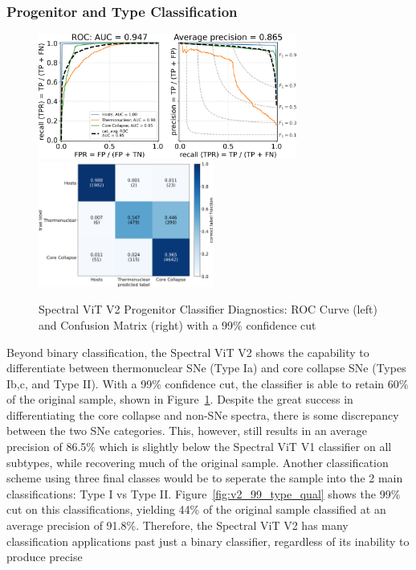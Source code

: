 \subsubsection{Progenitor and Type Classification}
\begin{figure}[htb!]
    \centering
    \includegraphics[height=4.1cm]{figures/v2_applications/vit_model_V2roc99_proj_e26.png}
    \quad
    \includegraphics[height=4.1cm]{figures/v2_applications/vit_model_V2cm99_proj_e26.png}
    \caption[Spectral ViT V2 Progenitor Classifier Diagnostics]{Spectral ViT V2 
    Progenitor Classifier Diagnostics: ROC Curve (left) and Confusion Matrix (right) with a 99\% confidence
    cut\label{fig:v2_99_proj_qual}}
\end{figure}
Beyond binary classification, the Spectral ViT V2 shows the capability to differentiate between 
thermonuclear SNe (Type Ia) and core collapse SNe (Types Ib,c, and Type II). With a 99\% confidence 
cut, the classifier is able to retain 60\% of the original sample, shown in Figure~\ref{fig:v2_99_proj_qual}. 
Despite the great success in differentiating the core collapse and non-SNe spectra, there is some discrepancy 
between the two SNe categories. This, however, still results in an average precision of 86.5\% which is slightly
below the Spectral ViT V1 classifier on all subtypes, while recovering much of the original sample. 
Another classification scheme using three final classes would be to seperate the sample into the 2 main 
classifications: Type I vs Type II. Figure~\ref{fig:v2_99_type_qual} shows the 99\% cut on this classifications, 
yielding 44\% of the original sample classified at an average precision of 91.8\%. Therefore, the Spectral ViT V2
has many classification applications past just a binary classifier, regardless of its inability to produce precise 
